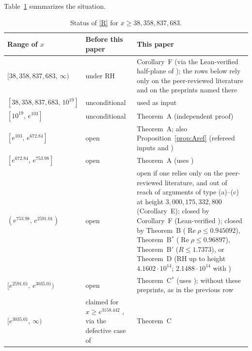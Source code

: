 \documentclass{amsart}
\theoremstyle{definition}
\theoremstyle{remark}
\theoremstyle{plain}
\numberwithin{equation}{section}
\newcommand{\NN}{38{,}358{,}837{,}683}
\newcommand{\HRH}{3{,}000{,}175{,}332{,}800}
\newcommand{\TDhyp}{4.1602\cdot10^{14}}
\newcommand{\TDpre}{2.1488\cdot10^{14}}
\newcommand{\Cstar}{C$^*$}
\newcommand{\Bp}{B$'$}
\newcommand{\Bstar}{B$^*$}
\newcommand{\thetaB}{0.945092}
\begin{document}
Table~\ref{tab:status} summarizes the situation.

\begin{table}[ht]
\caption{Status of \eqref{R} for $x\ge\NN$.}\label{tab:status}
\small
\begin{tabular}{>{\raggedright\arraybackslash}p{3.1cm}>{\raggedright\arraybackslash}p{4.2cm}>{\raggedright\arraybackslash}p{5.9cm}}
\toprule
Range of $x$ & Before this paper & This paper\\
\midrule
$[\NN,\,\infty)$ & under RH \cite{DP15} & Corollary~F (via the Lean-verified half-plane of \cite{OAI26}); the rows below rely only on the peer-reviewed literature and on the preprints named there\\\addlinespace[2pt]
$[\NN,\,10^{19}]$ & unconditional \cite[Thm.~1.3]{Ax17} & used as input\\\addlinespace[2pt]
$[10^{19},\,e^{103}]$ & unconditional \cite[Thm.~5.1]{Joh22} & Theorem~A (independent proof)\\\addlinespace[2pt]
$[e^{103},\,e^{672.84}]$ & open & Theorem~A; also Proposition~\ref{prop:Aref} (refereed inputs and \cite{Bha24})\\\addlinespace[2pt]
$[e^{672.84},\,e^{753.98}]$ & open & Theorem~A (uses \cite{CH25})\\\addlinespace[2pt]
$(e^{753.98},\,e^{2591.01})$ & open & open if one relies only on the peer-reviewed literature, and out of reach of arguments of type (a)--(c) at height $\HRH$ (Corollary~E); closed by Corollary~F (Lean-verified \cite{OAI26}); closed by Theorem~B ($\operatorname{Re}\rho\le\thetaB$), Theorem~\Bstar{} ($\operatorname{Re}\rho\le0.96897$), Theorem~\Bp{} ($R\le1.7373$), or Theorem~D (RH up to height $\TDhyp$; $\TDpre$ with \cite{BTY26,Bel24})\\\addlinespace[2pt]
$[e^{2591.01},\,e^{3035.01})$ & open & Theorem~\Cstar{} (uses \cite{BTY26,Bel24}); without these preprints, as in the previous row\\\addlinespace[2pt]
$[e^{3035.01},\,\infty)$ & claimed for $x\ge e^{3158.442}$ \cite{Ax22}, via the defective case of \cite[Lemma~2.1]{DP15} & Theorem~C\\
\bottomrule
\end{tabular}
\end{table}
\end{document}
